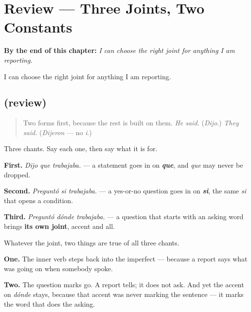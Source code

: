 
\chapter{Review --- Three Joints, Two Constants}
\label{ch:repaso-reportar}

\begin{chapteropening}
\textbf{By the end of this chapter:} \emph{I can choose the right joint for anything I am reporting.}

I can choose the right joint for anything I am reporting.
\end{chapteropening}

\section[(review)]{(review)}

\label{lesson:ES-C57-repaso-reportar}



\begin{quote}
Two forms first, because the rest is built on them. \emph{He said.} (\emph{Dijo}.) \emph{They said.} (\emph{Dijeron} — no \emph{i}.)
\end{quote}

\begin{grammarlens}[title={What you've built}]
Three chants. Say each one, then say what it is for.

\textbf{First.} \emph{Dijo que trabajaba.} — a statement goes in on \emph{\textbf{que}}, and \emph{que} may never be dropped.

\textbf{Second.} \emph{Preguntó si trabajaba.} — a yes-or-no question goes in on \emph{\textbf{si}}, the same \emph{si} that opens a condition.

\textbf{Third.} \emph{Preguntó dónde trabajaba.} — a question that starts with an asking word brings \textbf{its own joint}, accent and all.
\end{grammarlens}

\begin{grammarlens}[title={Grammar Lens: the two things that never change}]
Whatever the joint, two things are true of all three chants.

\textbf{One.} The inner verb steps back into the imperfect — because a report says what was going on when somebody spoke.

\textbf{Two.} The question marks go. A report tells; it does not ask. And yet the accent on \emph{dónde} stays, because that accent was never marking the sentence — it marks the word that does the asking.
\end{grammarlens}

